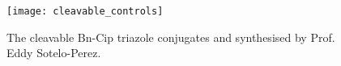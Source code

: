 \begin{figure}[H]
	\begin{center}
		\texttt{[image: cleavable\_controls]}
		\caption{
			The cleavable Bn-Cip triazole conjugates  and  synthesised by Prof. Eddy Sotelo-Perez.
			\label{fig:cleavable_controls}}
	\end{center}
\end{figure}




